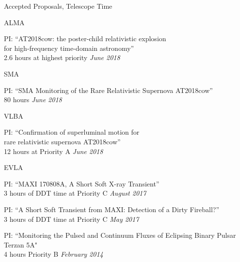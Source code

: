 \documentclass{resume} %
\begin{document}
\begin{rSection}{Accepted Proposals, Telescope Time}

\begin{rSubsection}{ALMA}{}{}{}
\item PI: ``AT2018cow: the poster-child relativistic explosion \\
  for high-frequency time-domain astronomy'' \\
  2.6 hours at highest priority \hfill {\em June 2018}
\end{rSubsection}

\begin{rSubsection}{SMA}{}{}{}
\item PI: ``SMA Monitoring of the Rare Relativistic Supernova AT2018cow'' \\
  80 hours \hfill {\em June 2018}
\end{rSubsection}

\begin{rSubsection}{VLBA}{}{}{}
\item PI: ``Confirmation of superluminal motion for \\
  rare relativistic supernova AT2018cow''\\
  12 hours at Priority A \hfill {\em June 2018}
\end{rSubsection}

\begin{rSubsection}{EVLA}{}{}{}
\item PI: ``MAXI 170808A, A Short Soft X-ray Transient'' \\
  3 hours of DDT time at Priority C \hfill {\em August 2017}
\item PI: ``A Short Soft Transient from MAXI: Detection of a Dirty Fireball?'' \\
  3 hours of DDT time at Priority C \hfill {\em May 2017}
\item PI: ``Monitoring the Pulsed and Continuum Fluxes of Eclipsing Binary Pulsar Terzan 5A" \\
4 hours Priority B \hfill {\em February 2014}
\end{rSubsection}

\end{rSection}

\end{document}
